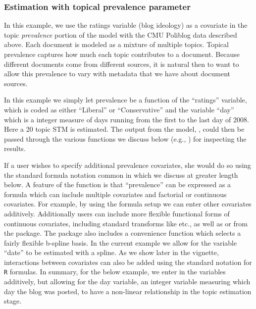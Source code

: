 \documentclass[nojss]{jss}
\begin{document}
\subsubsection{Estimation with topical prevalence parameter}

In this example, we use the ratings variable (blog ideology) as a covariate in the topic \emph{prevalence} portion of the model with the CMU Poliblog data described above. Each document is modeled as a mixture of multiple topics. Topical prevalence captures how much each topic contributes to a document. Because different documents come from different sources, it is natural then to want to allow this prevalence to vary with metadata that we have about document sources.

In this example we simply let prevalence be a function of the ``ratings'' variable, which is coded as either ``Liberal'' or ``Conservative'' and the variable ``day'' which is a integer measure of days running from the first to the last day of 2008. Here a 20 topic STM is estimated. The output from the model, , could then be passed through the various functions we discuss below (e.g., ) for inspecting the results.

If a user wishes to specify additional prevalence covariates, she would do so using the standard formula notation common in  which we discuss at greater length below. A feature of the  function is that ``prevalence'' can be expressed as a formula which can include multiple covariates and factorial or continuous covariates.  For example, by using the formula setup we can enter other covariates additively. Additionally users can include more flexible functional forms of continuous covariates, including standard transforms like  etc., as well as  or  from the  package. The  package also includes a convenience function  which selects a fairly flexible b-spline basis. In the current example we allow for the variable ``date'' to be estimated with a spline. As we show later in the vignette, interactions between covariates can also be added using the standard notation for \texttt{R} formulas. In summary, for the below example, we enter in the variables additively, but allowing for the day variable, an integer variable measuring which day the blog was posted, to have a non-linear relationship in the topic estimation stage.

\begin{Schunk}
\end{Schunk}
\end{document}
